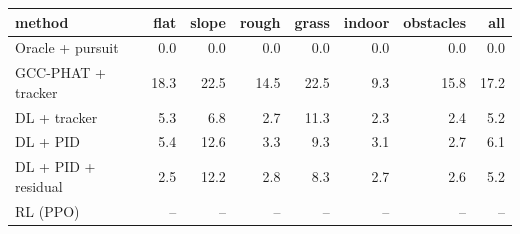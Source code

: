 \begin{tabular}{lrrrrrrr}
\toprule
method & flat & slope & rough & grass & indoor & obstacles & all\\
\midrule
Oracle + pursuit & 0.0 & 0.0 & 0.0 & 0.0 & 0.0 & 0.0 & 0.0 \\
GCC-PHAT + tracker & 18.3 & 22.5 & 14.5 & 22.5 & 9.3 & 15.8 & 17.2 \\
DL + tracker & 5.3 & 6.8 & 2.7 & 11.3 & 2.3 & 2.4 & 5.2 \\
DL + PID & 5.4 & 12.6 & 3.3 & 9.3 & 3.1 & 2.7 & 6.1 \\
DL + PID + residual & 2.5 & 12.2 & 2.8 & 8.3 & 2.7 & 2.6 & 5.2 \\
RL (PPO) & -- & -- & -- & -- & -- & -- & -- \\
\bottomrule
\end{tabular}
